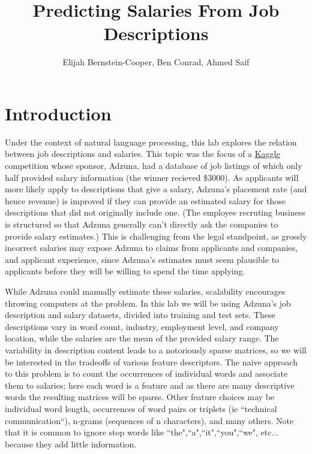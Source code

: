 \documentclass[12pt]{article}
\begin{document}
\title{Predicting Salaries From Job Descriptions}

\author{
Elijah Bernstein-Cooper, Ben Conrad, Ahmed Saif
}
\maketitle



\section{Introduction}

    Under the context of natural language processing, this lab explores the
    relation between job descriptions and salaries.  This topic was the focus
    of a \href{http://www.kaggle.com/c/job-salary-prediction}{Kaggle}
    competition whose sponsor, Adzuna, had a database of job listings of which
    only half provided salary information (the winner recieved \$3000).  As
    applicants will more likely apply to descriptions that give a salary,
    Adzuna's placement rate (and hence revenue) is improved if they can provide
    an estimated salary for those descriptions that did not originally include
    one.  (The employee recruting business is structured so that Adzuna
    generally can't directly ask the companies to provide salary estimates.)
    This is challenging from the legal standpoint, as grossly incorrect
    salaries may expose Adzuna to claims from applicants and companies, and
    applicant experience, since Adzuna's estimates must seem plausible to
    applicants before they will be willing to spend the time applying.

    While Adzuna could manually estimate these salaries, scalability encourages
    throwing computers at the problem.  In this lab we will be using Adzuna's
    job description and salary datasets, divided into training and test sets.
    These descriptions vary in word count, industry, employment level, and
    company location, while the salaries are the mean of the provided salary
    range.  The variability in description content leads to a notoriously
    sparse matrices, so we will be interested in the tradeoffs of various
    feature descriptors.  The naive approach to this problem is to count the
    occurrences of individual words and associate them to salaries; here each
    word is a feature and as there are many descriptive words the resulting
    matrices will be sparse.  Other feature choices may be individual word
    length, occurrences of word pairs or triplets (ie ``technical
    communication``), n-grams (sequences of n characters), and many others.
    Note that it is common to ignore stop words like
    ``the",``a",``it",``you",``we", etc... because they add little information.
\end{document}
